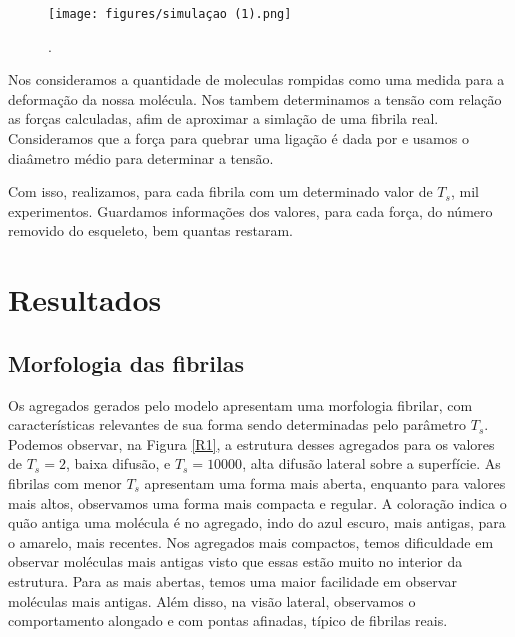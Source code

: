 \documentclass{article}
\begin{document}
        \begin{figure}[H]
            \centering
            \texttt{[image: figures/simulaçao (1).png]}
    
            \caption{.} 
    
            \label{M4}
        \end{figure}

        Nos consideramos a quantidade de moleculas rompidas como uma medida para a deformação da nossa molécula. Nos tambem determinamos a tensão com relação 
        as forças calculadas, afim de aproximar a simlação de uma fibrila real. Consideramos que a força para quebrar uma ligação é dada por e usamos o diaâmetro 
        médio para determinar a tensão.

        Com isso, realizamos, para cada fibrila com um determinado valor de $T_{s}$, mil experimentos. Guardamos informações dos valores, para cada força, do número removido do esqueleto, bem quantas restaram.


\section{Resultados}
    \subsection{Morfologia das fibrilas}

    Os agregados gerados pelo modelo apresentam uma morfologia fibrilar, com características relevantes de sua forma 
    sendo determinadas pelo parâmetro \(T_{s}\). Podemos observar, na Figura \ref{R1}, a estrutura desses agregados 
    para os valores de \(T_{s} = 2\), baixa difusão, e \(T_{s} = 10000\), alta difusão lateral sobre a superfície. As 
    fibrilas com menor \(T_{s}\) apresentam uma forma mais aberta, enquanto para valores mais altos, observamos uma 
    forma mais compacta e regular. A coloração indica o quão antiga uma molécula é no agregado, indo do azul escuro, 
    mais antigas, para o amarelo, mais recentes. Nos agregados mais compactos, temos dificuldade em observar moléculas
    mais antigas visto que essas estão muito no interior da estrutura. Para as mais abertas, temos uma maior facilidade
    em observar moléculas mais antigas. Além disso, na visão lateral, observamos o comportamento alongado e com pontas 
    afinadas, típico de fibrilas reais. 
\end{document}
